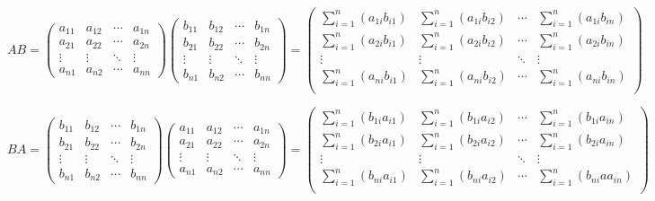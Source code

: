 \documentclass[a4paper]{report}
\begin{document}
\begin{zhengming}
\begin{equation*}
AB=
\begin{pmatrix}
a_{11}&a_{12}&\cdots&a_{1n}\\
a_{21}&a_{22}&\cdots&a_{2n}\\
\vdots&\vdots&\ddots&\vdots\\
a_{n1}&a_{n2}&\cdots&a_{nn}
\end{pmatrix}\begin{pmatrix}
b_{11}&b_{12}&\cdots&b_{1n}\\
b_{21}&b_{22}&\cdots&b_{2n}\\
\vdots&\vdots&\ddots&\vdots\\
b_{n1}&b_{n2}&\cdots&b_{nn}
\end{pmatrix}=
\begin{pmatrix}
\sum_{i=1}^{n}(a_{1i}b_{i1})&\sum_{i=1}^{n}(a_{1i}b_{i2})&\cdots&\sum_{i=1}^{n}(a_{1i}b_{in})\\
\sum_{i=1}^{n}(a_{2i}b_{i1})&\sum_{i=1}^{n}(a_{2i}b_{i2})&\cdots&\sum_{i=1}^{n}(a_{2i}b_{in})\\
\vdots&\vdots&\ddots&\vdots\\
\sum_{i=1}^{n}(a_{ni}b_{i1})&\sum_{i=1}^{n}(a_{ni}b_{i2})&\cdots&\sum_{i=1}^{n}(a_{ni}b_{in})\\
\end{pmatrix}
\end{equation*}

\begin{equation*}
BA=\begin{pmatrix}
b_{11}&b_{12}&\cdots&b_{1n}\\
b_{21}&b_{22}&\cdots&b_{2n}\\
\vdots&\vdots&\ddots&\vdots\\
b_{n1}&b_{n2}&\cdots&b_{nn}
\end{pmatrix}
\begin{pmatrix}
a_{11}&a_{12}&\cdots&a_{1n}\\
a_{21}&a_{22}&\cdots&a_{2n}\\
\vdots&\vdots&\ddots&\vdots\\
a_{n1}&a_{n2}&\cdots&a_{nn}
\end{pmatrix}=
\begin{pmatrix}
\sum_{i=1}^{n}(b_{1i}a_{i1})&\sum_{i=1}^{n}(b_{1i}a_{i2})&\cdots&\sum_{i=1}^{n}(b_{1i}a_{in})\\
\sum_{i=1}^{n}(b_{2i}a_{i1})&\sum_{i=1}^{n}(b_{2i}a_{i2})&\cdots&\sum_{i=1}^{n}(b_{2i}a_{in})\\
\vdots&\vdots&\ddots&\vdots\\
\sum_{i=1}^{n}(b_{ni}a_{i1})&\sum_{i=1}^{n}(b_{ni}a_{i2})&\cdots&\sum_{i=1}^{n}(b_{ni}aa_{in})\\
\end{pmatrix}
\end{equation*}


\end{zhengming}
\end{document}
